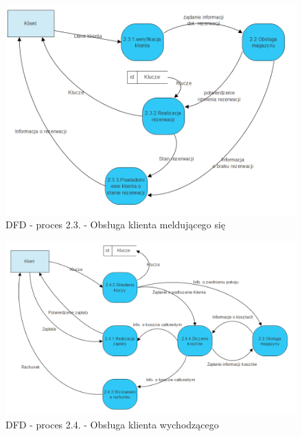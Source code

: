 \documentclass[a4paper, 11pt]{article}
\begin{document}
	\begin{figure}[H]%
			\center
			\includegraphics[scale=0.7]{Img/2-3.png}
			\caption{DFD - proces 2.3. - Obsługa klienta meldującego się}
	\end{figure}
	\begin{figure}[H]%
			\center
			\includegraphics[scale=0.6]{Img/2-4.png}
			\caption{ DFD - proces 2.4. - Obsługa klienta wychodzącego}
	\end{figure}	
\end{document}
